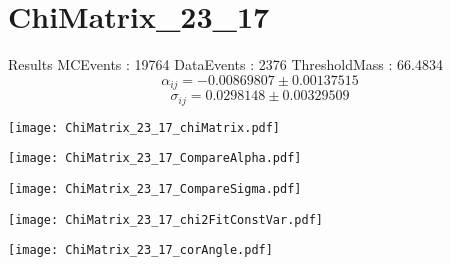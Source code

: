 \documentclass[a4paper,12pt]{article}
\begin{document}
\section{ChiMatrix\_23\_17}
\begin{minipage}{0.49\linewidth} Results \newline
MCEvents : 19764\newline
DataEvents : 2376 \newline
ThresholdMass : 66.4834\\
$$\alpha_{ij} = -0.00869807\pm 0.00137515$$
$$\sigma_{ij} = 0.0298148\pm 0.00329509$$
\end{minipage}\hfill
\begin{minipage}{0.49\linewidth} 
\texttt{[image: ChiMatrix\_23\_17\_chiMatrix.pdf]}\\
\end{minipage}
\hfill
\begin{minipage}{0.49\linewidth} 
\texttt{[image: ChiMatrix\_23\_17\_CompareAlpha.pdf]}\\
\end{minipage}
\hfill
\begin{minipage}{0.49\linewidth} 
\texttt{[image: ChiMatrix\_23\_17\_CompareSigma.pdf]}\\
\end{minipage}
\begin{minipage}{0.49\linewidth} 
\texttt{[image: ChiMatrix\_23\_17\_chi2FitConstVar.pdf]}\\
\end{minipage}
\hfill
\begin{minipage}{0.49\linewidth} 
\texttt{[image: ChiMatrix\_23\_17\_corAngle.pdf]}\\
\end{minipage}
\end{document}
